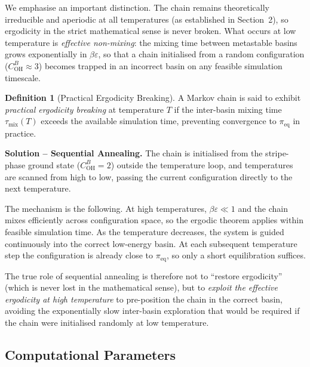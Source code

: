 \documentclass[12pt, a4paper]{article}
\theoremstyle{definition}
\newtheorem{definition}{Definition}[section]
\begin{document}
We emphasise an important distinction.
The chain remains theoretically irreducible and aperiodic at all
temperatures (as established in Section~2), so ergodicity in the
strict mathematical sense is never broken.
What occurs at low temperature is \emph{effective non-mixing}: the
mixing time between metastable basins grows exponentially in
$\beta\varepsilon$, so that a chain initialised from a random
configuration ($C_{\mathrm{OH}}^B \approx 3$) becomes trapped in
an incorrect basin on any feasible simulation timescale.

\begin{definition}[Practical Ergodicity Breaking]
A Markov chain is said to exhibit \emph{practical ergodicity breaking}
at temperature $T$ if the inter-basin mixing time $\tau_{\mathrm{mix}}(T)$
exceeds the available simulation time, preventing convergence to
$\pi_{\mathrm{eq}}$ in practice.
\end{definition}

\textbf{Solution -- Sequential Annealing.}
The chain is initialised from the stripe-phase ground state
($C_{\mathrm{OH}}^B = 2$) outside the temperature loop, and
temperatures are scanned from high to low, passing the current
configuration directly to the next temperature.

The mechanism is the following.
At high temperatures, $\beta\varepsilon \ll 1$ and the chain mixes
efficiently across configuration space, so the ergodic theorem
applies within feasible simulation time.
As the temperature decreases, the system is guided continuously
into the correct low-energy basin.
At each subsequent temperature step the configuration is already
close to $\pi_{\mathrm{eq}}$, so only a short equilibration suffices.

The true role of sequential annealing is therefore not to
``restore ergodicity'' (which is never lost in the mathematical
sense), but to \emph{exploit the effective ergodicity at high
temperature} to pre-position the chain in the correct basin,
avoiding the exponentially slow inter-basin exploration that
would be required if the chain were initialised randomly at
low temperature.

\subsection{Computational Parameters}
\end{document}
